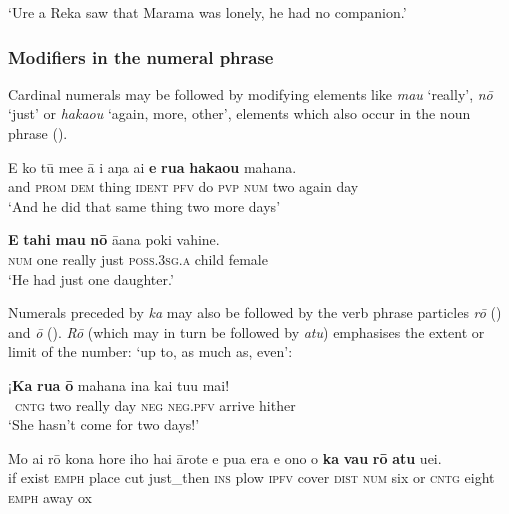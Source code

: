 \glt 
‘Ure a Reka saw that Marama was lonely, he had no companion.’ \textstyleExampleref{[Ley-7-48.013]}
\z

\subsubsection[Modifiers in the numeral phrase]{Modifiers in the numeral phrase}\label{sec:4.3.2.4}

Cardinal numerals may be followed by modifying elements like \textit{mau} ‘really’, \textit{nō} ‘just’ or \textit{haka{\ꞌ}ou} ‘again, more, other’, elements which also occur in the noun phrase ().

\ea\label{ex:4.35}
\gll {\ꞌ}E ko tū me{\ꞌ}e {\ꞌ}ā i aŋa ai \textbf{e} \textbf{rua} \textbf{haka{\ꞌ}ou} mahana. \\
and \textsc{prom} \textsc{dem} thing \textsc{ident} \textsc{pfv} do \textsc{pvp} \textsc{num} two again day \\

\glt 
‘And he did that same thing two more days’ \textstyleExampleref{[R532-07.021]}
\z

\ea\label{ex:4.36}
\gll \textbf{E} \textbf{tahi} \textbf{mau} \textbf{nō} {\ꞌ}ā{\ꞌ}ana poki vahine.\\
\textsc{num} one really just \textsc{poss.3sg.a} child female\\

\glt 
‘He had just one daughter.’ \textstyleExampleref{[R372.004]} 
\z

Numerals preceded by \textit{ka} may also be followed by the verb phrase particles \textit{rō} () and \textit{{\ꞌ}ō} (). \textit{Rō} (which may in turn be followed by \textit{atu}) emphasises the extent or limit of the number: ‘up to, as much as, even’:

\ea\label{ex:4.37}
\gll ¡\textbf{Ka} \textbf{rua} \textbf{{\ꞌ}ō} mahana {\ꞌ}ina kai tu{\ꞌ}u mai! \\
~\textsc{cntg} two really day \textsc{neg} \textsc{neg.pfv} arrive hither \\

\glt 
‘She hasn’t come for two days!’ \textstyleExampleref{[R229.132]} 
\z

\ea\label{ex:4.38}
\gll Mo ai rō kona hore iho hai {\ꞌ}ārote e pu{\ꞌ}a era e ono  {\ꞌ}o \textbf{ka} \textbf{va}{\ꞌ}\textbf{u} \textbf{rō} \textbf{atu} {\ꞌ}uei.\\
if exist \textsc{emph} place cut just\_then \textsc{ins} plow \textsc{ipfv} cover \textsc{dist} \textsc{num} six  or \textsc{cntg} eight \textsc{emph} away ox\\

